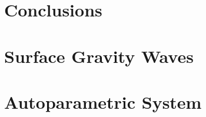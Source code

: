 \documentclass[letterpaper,tocnosub,noragright,centerchapter,12pt,edeposit]{uiucecethesis09}
\begin{document}
\chapter{Conclusions}
\label{c:conclusions}


\appendix
\chapter{Surface Gravity Waves}



\chapter{Autoparametric System}




\backmatter




% 
\end{document}
